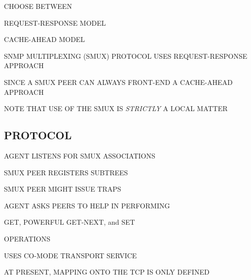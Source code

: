 \begin{bwslide}

\begin{nrtc}
\item	CHOOSE BETWEEN
    \begin{nrtc}
    \item	REQUEST-RESPONSE MODEL

    \item	CACHE-AHEAD MODEL
    \end{nrtc}

\item	SNMP MULTIPLEXING (SMUX) PROTOCOL USES REQUEST-RESPONSE APPROACH
    \begin{nrtc}
    \item	SINCE A SMUX PEER CAN ALWAYS FRONT-END A CACHE-AHEAD APPROACH
    \end{nrtc}

\item	NOTE THAT USE OF THE SMUX IS \emph{STRICTLY} A LOCAL MATTER
\end{nrtc}
\end{bwslide}




\begin{bwslide}
\part*	{PROTOCOL}\bf

\begin{nrtc}
\item	AGENT LISTENS FOR SMUX ASSOCIATIONS

\item	SMUX PEER REGISTERS SUBTREES

\item	SMUX PEER MIGHT ISSUE TRAPS

\item	AGENT ASKS PEERS TO HELP IN PERFORMING
    \begin{nrtc}
    \item	GET, POWERFUL GET-NEXT, and SET
    \end{nrtc}
    OPERATIONS

\item	USES CO-MODE TRANSPORT SERVICE
    \begin{nrtc}
    \item	AT PRESENT, MAPPING ONTO THE TCP IS ONLY DEFINED
    \end{nrtc}
\end{nrtc}
\end{bwslide}



